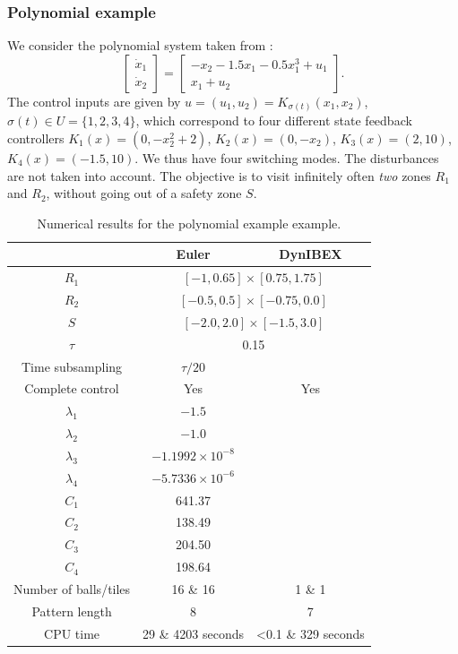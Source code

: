  \subsubsection{Polynomial example}
 We consider the polynomial system taken from \cite{liu2013synthesis}:
%
\begin{equation}
 \left \lbrack \begin{matrix}
  \dot x_1 \\ \dot x_2
 \end{matrix} \right \rbrack  =
 \left \lbrack \begin{matrix} -x_2 - 1.5 x_1 - 0.5 x_1^3 + u_1 \\ x_1 + u_2 
   \end{matrix} \right \rbrack.
\end{equation}
%
The control inputs are given by $u = (u_1,u_2) =
K_{\sigma(t)}(x_1,x_2)$, $\sigma(t) \in U = \{ 1,2,3,4 \}$, which correspond to
four different state feedback controllers $K_1(x) = (0,-x_2^2 + 2)$,
$K_2(x) = (0,-x_2)$, $K_3(x) = (2,10)$, $K_4(x) = (-1.5,10)$.  We thus
have four switching modes. The disturbances are not taken into account.
The objective is to visit infinitely often {\em two} zones $R_1$ and $R_2$,
without going out of a safety zone $S$.
 
 
 
 \begin{table}[ht]
 \centering
\begin{tabular}{|c|c|c|}
 \hline 
 &\multicolumn{1}{c|}{Euler} & \multicolumn{1}{c|}{DynIBEX} \\
\hline
 $R_1$ & \multicolumn{2}{c|}{$[-1,0.65]\times[0.75,1.75]$} \\
 $R_2$ & \multicolumn{2}{c|}{$[-0.5,0.5]\times[-0.75,0.0]$ }\\
 $S$ &  \multicolumn{2}{c|}{$[-2.0,2.0]\times[-1.5,3.0]$ }\\
 \hline
$\tau$ & \multicolumn{2}{c|}{0.15} \\
\hline
Time subsampling & $\tau/20$ & \\
\hline
 Complete control & Yes & Yes \\
\hline
$\lambda_1$  & $-1.5$   &   \\
$\lambda_2$  &  $-1.0$ &\\
$\lambda_3$  &  $-1.1992 \times 10^{-8}$ & \\
$\lambda_4$ &  $-5.7336 \times 10^{-6}$ & \\
$C_{1}$  &  641.37     &    \\
$C_{2}$ &  138.49 &\\
$C_{3}$  &  204.50 & \\
$C_{4}$ & 198.64 &\\
\hline
Number of balls/tiles & 16 \& 16 & 1 \& 1 \\
Pattern length & 8  & 7  \\
\hline
CPU time & 29 \& 4203  seconds & <0.1 \& 329 seconds \\ \hline
  \end{tabular}
\label{table:PE}
\caption{Numerical results for the polynomial example example.}
 \end{table}

